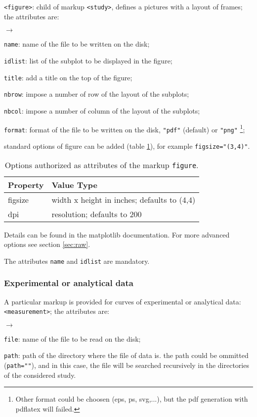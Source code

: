 \documentclass[a4paper,10pt,twoside]{csshortdoc}
\begin{document}
\texttt{<figure>}: child of markup \texttt{<study>}, defines a pictures
with a layout of frames; the attributes are:
\begin{list}{$\rightarrow$}{}
\item \texttt{name}: name of the file to be written on the disk;
\item \texttt{idlist}: list of the subplot to be displayed in the figure;
\item \texttt{title}: add a title on the top of the figure;
\item \texttt{nbrow}: impose a number of row of the layout of the subplots;
\item \texttt{nbcol}: impose a number of column of the layout of the subplots;
\item \texttt{format}: format of the file to be written on the disk,
\texttt{"pdf"} (default) or \texttt{"png"} \footnote{Other format could
be choosen (eps, ps, svg,...), but the pdf generation with pdflatex will failed.};
\item standard options of figure can be added (table \ref{table:fig}),
for example \texttt{figsize="(3,4)"}.

\begin{table}[htbp]
\begin{center}
\begin{tabular}{|l|l|}
\hline
\textbf{Property} & \textbf{Value Type} \\
\hline
figsize   & width x height in inches; defaults to (4,4) \\
dpi       & resolution; defaults to 200 \\
\hline
\end{tabular}
\end{center}
\caption{Options authorized as attributes of the markup \texttt{figure}.}
\label{table:fig}
\end{table}

Details can be found in the matplotlib documentation.
For more advanced options see section \ref{sec:raw}.

\end{list}

The attributes \texttt{name} and \texttt{idlist} are mandatory.

\subsubsection{Experimental or analytical data}

A particular markup is provided for curves of experimental or analytical data:
\texttt{<measurement>}; the attributes are:
\begin{list}{$\rightarrow$}{}
\item \texttt{file}: name of the file to be read on the disk;
\item \texttt{path}: path of the directory where the file of data
is. the path could be ommitted (\texttt{path=""}), and in this case, the file
will be searched recursively in the directories of the considered study.
\end{list}
\end{document}
